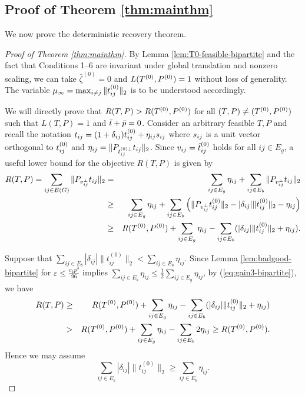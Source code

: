 \subsection{Proof of Theorem \ref{thm:mainthm}} \label{sec-proof-mainthm}


We now prove the deterministic recovery theorem.

\begin{proof}[Proof of Theorem \ref{thm:mainthm}]

By Lemma \ref{lem:T0-feasible-bipartite} and the fact that Conditions 1--6 are invariant under global translation and nonzero scaling, we can take $\bar{\zeta}^{(0)} =0$ and $L(T^{(0)}, P^{(0)}) = 1$ without loss of generality.  The variable $\mu_{\infty} =  \max_{i\neq j} \|t^{{(0)}}_{ij}\|_2$ is to be understood accordingly.  


We will directly prove that $R(T, P) > R(T^{(0)}, P^{(0)})$ for all $(T, P) \neq (T^{(0)}, P^{(0)})$ such that $L(T, P)=1$ and $\bar{t} + \bar{p} = 0$. Consider an arbitrary feasible $T,P$ and recall the notation $t_{ij} = (1 + \delta_{ij}) t^{{(0)}}_{ij} + \eta_{ij} s_{ij}$ where $s_{ij}$ is a unit vector orthogonal to $t^{{(0)}}_{ij}$ and $\eta_{ij} = \| P_{t^{{(0)}\perp}_{ij}} t_{ij} \|_2$. Since $v_{ij} =\hat{t}^{(0)}_{ij}$ holds for all $ij \in E_g$, a useful lower bound for the objective $R(T,P)$ is given by 
\begin{eqnarray}
	R(T,P)
	=\sum_{ij \in E(G)}\|P_{v_{ij}^{\perp}}t_{ij}\| _2
	& = & \sum_{ij\in E_{g}}\eta_{ij}+\sum_{ij\in E_{b}}\|P_{v_{ij}^{\perp}}t_{ij}\|_2\nonumber \\
	& \ge & \sum_{ij\in E_{g}}\eta_{ij}+\sum_{ij\in E_{b}}\left(\|P_{v_{ij}^{\perp}}t_{ij}^{(0)}\|_2-|\delta_{ij}|\|t_{ij}^{(0)}\|_2-\eta_{ij}\right)\nonumber \\
	& \ge & R(T^{(0)}, P^{(0)})+\sum_{ij\in E_{g}}\eta_{ij}-\sum_{ij\in E_{b}}(|\delta_{ij}|\|t_{ij}^{(0)}\|_2+\eta_{ij}).\label{eq:gain3-bipartite}
\end{eqnarray}


Suppose that $\sum_{ij\in E_{b}}|\delta_{ij}|\|t_{ij}^{(0)}\|_2<\sum_{ij\in E_{b}}\eta_{ij}$.
Since Lemma \ref{lem:badgood-bipartite} for $\varepsilon\le\frac{c_{1}p^3}{96}$
implies $\sum_{ij\in E_{b}}\eta_{ij}\le\frac{1}{2}\sum_{ij\in E_{g}}\eta_{ij}$,
by (\ref{eq:gain3-bipartite}), we have
\begin{eqnarray*}
	R(T,P) & \ge & R(T^{(0)}, P^{(0)})+\sum_{ij\in E_{g}}\eta_{ij}-\sum_{ij\in E_{b}}(|\delta_{ij}|\|t_{ij}^{(0)}\|_2+\eta_{ij})\\
	& > & R(T^{(0)}, P^{(0)})+\sum_{ij\in E_{g}}\eta_{ij}-\sum_{ij\in E_{b}}2\eta_{ij}\ge R(T^{(0)}, P^{(0)}).
\end{eqnarray*}
Hence we may assume 
\begin{equation}
	\sum_{ij\in E_{b}}|\delta_{ij}|\|t_{ij}^{(0)}\|_2\ge\sum_{ij\in E_{b}}\eta_{ij}.\label{eq:badtwist-bipartite}
\end{equation}


\end{proof}
